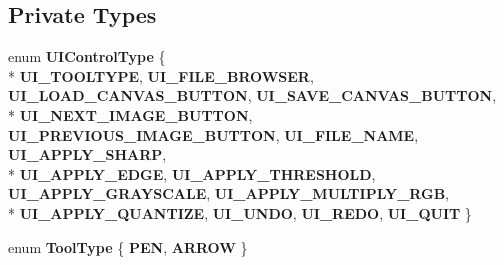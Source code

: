 \subsection*{Private Types}
\begin{DoxyCompactItemize}
\item 
enum {\bfseries U\+I\+Control\+Type} \{ \\*
{\bfseries U\+I\+\_\+\+T\+O\+O\+L\+T\+Y\+PE}, 
{\bfseries U\+I\+\_\+\+F\+I\+L\+E\+\_\+\+B\+R\+O\+W\+S\+ER}, 
{\bfseries U\+I\+\_\+\+L\+O\+A\+D\+\_\+\+C\+A\+N\+V\+A\+S\+\_\+\+B\+U\+T\+T\+ON}, 
{\bfseries U\+I\+\_\+\+S\+A\+V\+E\+\_\+\+C\+A\+N\+V\+A\+S\+\_\+\+B\+U\+T\+T\+ON}, 
\\*
{\bfseries U\+I\+\_\+\+N\+E\+X\+T\+\_\+\+I\+M\+A\+G\+E\+\_\+\+B\+U\+T\+T\+ON}, 
{\bfseries U\+I\+\_\+\+P\+R\+E\+V\+I\+O\+U\+S\+\_\+\+I\+M\+A\+G\+E\+\_\+\+B\+U\+T\+T\+ON}, 
{\bfseries U\+I\+\_\+\+F\+I\+L\+E\+\_\+\+N\+A\+ME}, 
{\bfseries U\+I\+\_\+\+A\+P\+P\+L\+Y\+\_\+\+S\+H\+A\+RP}, 
\\*
{\bfseries U\+I\+\_\+\+A\+P\+P\+L\+Y\+\_\+\+E\+D\+GE}, 
{\bfseries U\+I\+\_\+\+A\+P\+P\+L\+Y\+\_\+\+T\+H\+R\+E\+S\+H\+O\+LD}, 
{\bfseries U\+I\+\_\+\+A\+P\+P\+L\+Y\+\_\+\+G\+R\+A\+Y\+S\+C\+A\+LE}, 
{\bfseries U\+I\+\_\+\+A\+P\+P\+L\+Y\+\_\+\+M\+U\+L\+T\+I\+P\+L\+Y\+\_\+\+R\+GB}, 
\\*
{\bfseries U\+I\+\_\+\+A\+P\+P\+L\+Y\+\_\+\+Q\+U\+A\+N\+T\+I\+ZE}, 
{\bfseries U\+I\+\_\+\+U\+N\+DO}, 
{\bfseries U\+I\+\_\+\+R\+E\+DO}, 
{\bfseries U\+I\+\_\+\+Q\+U\+IT}
 \}\hypertarget{classMIAApp_ad2247859b449997f25adfce1b5b86847}{}\label{classMIAApp_ad2247859b449997f25adfce1b5b86847}

\item 
enum {\bfseries Tool\+Type} \{ {\bfseries P\+EN}, 
{\bfseries A\+R\+R\+OW}
 \}\hypertarget{classMIAApp_aae34b65a971e067ff957365bbd98d65c}{}\label{classMIAApp_aae34b65a971e067ff957365bbd98d65c}

\end{DoxyCompactItemize}
